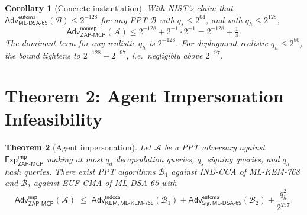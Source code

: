 \documentclass[11pt,a4paper]{article}
\newtheorem{theorem}{Theorem}
\newtheorem{corollary}[theorem]{Corollary}
\theoremstyle{definition}
\theoremstyle{remark}
\newcommand{\zapmcp}{\textsf{ZAP-MCP}\xspace}
\newcommand{\Adv}{\mathsf{Adv}}
\newcommand{\Exp}{\mathsf{Exp}}
\newcommand{\KEM}{\textsf{KEM}}
\newcommand{\Sign}{\textsf{Sig}}
\begin{document}
\begin{corollary}[Concrete instantiation]\label{cor:nonrep}
With NIST's claim that
$\Adv^{\mathsf{eufcma}}_{\mathsf{ML\text{-}DSA\text{-}65}}(\mathcal{B}) \leq 2^{-128}$
for any PPT $\mathcal{B}$ with $q_s \leq 2^{64}$, and with $q_h \leq
2^{128}$,
\[
\Adv^{\mathsf{nonrep}}_{\zapmcp{}}(\mathcal{A}) \leq 2^{-128} + 2^{-1} \cdot 2^{-1}
= 2^{-128} + \tfrac{1}{4}.
\]
The dominant term for any realistic $q_h$ is $2^{-128}$. For
deployment-realistic $q_h \leq 2^{80}$, the bound tightens to
$2^{-128} + 2^{-97}$, i.e.\ negligibly above $2^{-97}$.
\end{corollary}

\section{Theorem 2: Agent Impersonation Infeasibility}

\begin{theorem}[Agent impersonation]\label{thm:imp}
Let $\mathcal{A}$ be a PPT adversary against
$\Exp^{\mathsf{imp}}_{\zapmcp{}}$ making at most $q_d$ decapsulation
queries, $q_s$ signing queries, and $q_h$ hash queries. There exist
PPT algorithms $\mathcal{B}_1$ against IND-CCA of ML-KEM-768 and
$\mathcal{B}_2$ against EUF-CMA of ML-DSA-65 with
\[
\Adv^{\mathsf{imp}}_{\zapmcp{}}(\mathcal{A}) \;\leq\;
\Adv^{\mathsf{indcca}}_{\KEM,\mathsf{ML\text{-}KEM\text{-}768}}(\mathcal{B}_1)
+ \Adv^{\mathsf{eufcma}}_{\Sign,\mathsf{ML\text{-}DSA\text{-}65}}(\mathcal{B}_2)
+ \frac{q_h^2}{2^{257}}.
\]
\end{theorem}
\end{document}
